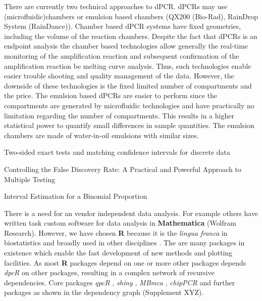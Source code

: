 \documentclass[a4,center,fleqn]{NAR}
\begin{document}
There are currently two technical approaches to dPCR. dPCRs may use		%
(microfluidic)chambers or emulsion based chambers 
(QX200 \texttrademark (Bio-Rad), RainDrop \texttrademark System (RainDance)). 
Chamber based dPCR systems have fixed geometries, including the volume of the 
reaction chambers. Despite the fact that dPCRs is an endpoint analysis the 
chamber based technologies allow generally the real-time monitoring of the 
amplification reaction and subsequent confirmation of the amplification reaction 
be melting curve analysis. Thus, such technologies enable easier trouble 
shooting and quality management of the data. However, the downside of these 
technologies is the fixed limited number of compartments and the price. The 
emulsion based dPCRs are easier to perform since the compartments are generated 
by microfluidic technologies and have practically no limitation regarding the 
number of compartments. This results in a higher statistical power to quantify 
small differences in sample quantities. The emulsion chambers are made of 
water-in-oil emulsions with similar sizes.


Two-sided exact tests and matching confidence intervals for discrete data \cite{fay_2010}

Controlling the False Discovery Rate: A Practical and Powerful Approach to Multiple Testing \cite{benjamini_1995}

Interval Estimation for a Binomial Proportion \cite{brown_2001}

There is a need for an vendor independent data analysis. For example others 
\cite{strain_highly_2013} have written task custom software for data analysis in 
\textbf{Mathematica} (Wolfram Research). However, we have chosen \textbf{R} 
because it is the \textit{lingua franca} in biostatistics and broadly used in 
other disciplines \cite{rodiger_r_2015}. The are many packages in existence 
which enable the fast development of new methods and plotting facilities. As 
most \textbf{R} packages depend on one or more other packages \cite{ooms_2013} 
depends \textit{dpcR} on other packages, resulting in a complex network of 
recursive dependencies. Core packages \textit{qpcR} \cite{ritz_qpcr_2008}, 
\textit{shiny} \cite{shiny}, \textit{MBmca} \cite{rodiger_surface_2013}, 
\textit{chipPCR} \cite{rodiger_chippcr_2015} and further packages as shown in 
the dependency graph (Supplement XYZ).


\enlargethispage{-65.1pt}
\end{document}
